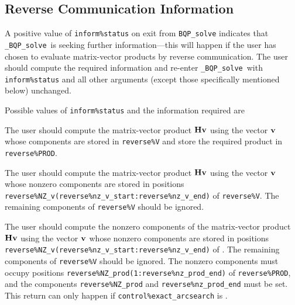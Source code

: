 \documentclass{galahad}
\newcommand{\packagename}{BQP}
\newcommand{\fullpackagename}{\libraryname\_\packagename}
\newcommand{\solver}{{\tt \fullpackagename\_solve}}
\begin{document}

\subsection{\label{reverse}Reverse Communication Information}

A positive value of {\tt inform\%status} on exit from 
{\tt \packagename\_solve}
indicates that
\solver\ is seeking further information---this will happen 
if the user has chosen to evaluate matrix-vector products by
reverse communication.
The user should compute the required information and re-enter \solver\
with {\tt inform\%status} and all other arguments (except those specifically
mentioned below) unchanged.

Possible values of {\tt inform\%status} and the information required are
\begin{description}
 The user should compute the matrix-vector product ${\mathbf{H}} {\mathbf{v}}$ 
     using the vector ${\mathbf{v}}$ whose components are stored in {\tt reverse\%V}
     and store the required product in {\tt reverse\%PROD}.

 The user should compute the matrix-vector product ${\mathbf{H}} {\mathbf{v}}$ 
     using the vector ${\mathbf{v}}$ whose nonzero components are stored in 
     positions  
     {\tt reverse\%NZ\_v(reverse\%nz\_v\_start:reverse\%nz\_v\_end)} 
     of {\tt reverse\%V}. The remaining components of {\tt reverse\%V}
     should be ignored.

 The user should compute the nonzero components of the 
     matrix-vector product ${\mathbf{H}} {\mathbf{v}}$ 
     using the vector ${\mathbf{v}}$ whose nonzero components are stored in 
     positions  
     {\tt reverse\%NZ\_v(reverse\%nz\_v\_start:reverse\%nz\_v\_end)} 
     of \linebreak {\tt reverse\%V}. The remaining components of 
     {\tt reverse\%V}
     should be ignored. The nonzero components must occupy positions
     {\tt reverse\%NZ\_prod(1:reverse\%nz\_prod\_end)} of {\tt reverse\%PROD},
     and the components \linebreak
     {\tt reverse\%NZ\_prod} and {\tt reverse\%nz\_prod\_end} must be set.
     This return can only happen if {\tt control\%exact\_arcsearch} is \true.

\end{description}



\end{document}
